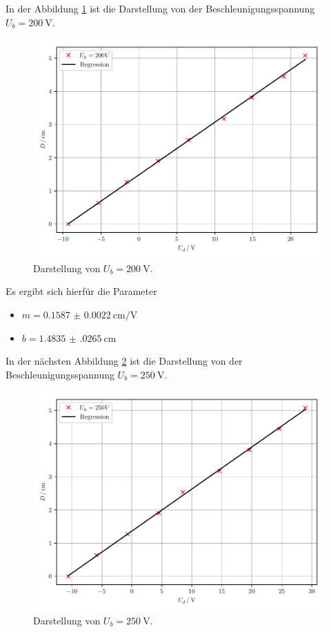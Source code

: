 In der Abbildung \ref{abb:6} ist die Darstellung von der Beschleunigungsspannung $U_b=\SI{200}{\volt}$.
\begin{figure}[H]
  \centering
  \includegraphics{plot1.pdf}
  \caption{Darstellung von $U_b= \SI{200}{\volt}$.}
  \label{abb:6}
\end{figure}
Es ergibt sich hierfür die Parameter
\begin{itemize}
  \item $m=\SI{0.1587(22)}{\centi\meter\per\volt}$
  \item $b=\SI{1.4835(0265)}{\centi\meter}$
\end{itemize}
In der nächsten Abbildung \ref{abb:7} ist die Darstellung von der Beschleunigungsspannung $U_b=\SI{250}{\volt}$.
\begin{figure}[H]
  \centering
  \includegraphics{plot2.pdf}
  \caption{Darstellung von $U_b=\SI{250}{\volt}$.}
  \label{abb:7}
\end{figure}
